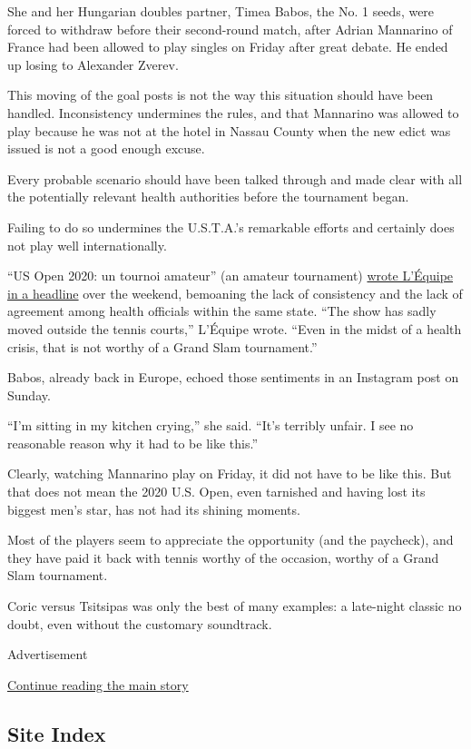 She and her Hungarian doubles partner, Timea Babos, the No. 1 seeds,
were forced to withdraw before their second-round match, after Adrian
Mannarino of France had been allowed to play singles on Friday after
great debate. He ended up losing to Alexander Zverev.

This moving of the goal posts is not the way this situation should have
been handled. Inconsistency undermines the rules, and that Mannarino was
allowed to play because he was not at the hotel in Nassau County when
the new edict was issued is not a good enough excuse.

Every probable scenario should have been talked through and made clear
with all the potentially relevant health authorities before the
tournament began.

Failing to do so undermines the U.S.T.A.'s remarkable efforts and
certainly does not play well internationally.

``US Open 2020: un tournoi amateur'' (an amateur tournament)
\href{https://www.lequipe.fr/Tennis/Article/Us-open-2020-un-tournoi-amateur/1168610}{wrote
L'Équipe in a headline} over the weekend, bemoaning the lack of
consistency and the lack of agreement among health officials within the
same state. ``The show has sadly moved outside the tennis courts,''
L'Équipe wrote. ``Even in the midst of a health crisis, that is not
worthy of a Grand Slam tournament.''

Babos, already back in Europe, echoed those sentiments in an Instagram
post on Sunday.

``I'm sitting in my kitchen crying,'' she said. ``It's terribly unfair.
I see no reasonable reason why it had to be like this.''

Clearly, watching Mannarino play on Friday, it did not have to be like
this. But that does not mean the 2020 U.S. Open, even tarnished and
having lost its biggest men's star, has not had its shining moments.

Most of the players seem to appreciate the opportunity (and the
paycheck), and they have paid it back with tennis worthy of the
occasion, worthy of a Grand Slam tournament.

Coric versus Tsitsipas was only the best of many examples: a late-night
classic no doubt, even without the customary soundtrack.

Advertisement

\protect\hyperlink{after-bottom}{Continue reading the main story}

\hypertarget{site-index}{%
\subsection{Site Index}\label{site-index}}

